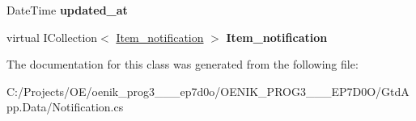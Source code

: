 \begin{DoxyCompactItemize}
\item 
\mbox{\label{class_gtd_app_1_1_data_1_1_notification_a1fbee509d8cb08e1e53fd6033822039a}} 
Date\+Time {\bfseries updated\+\_\+at}
\item 
\mbox{\label{class_gtd_app_1_1_data_1_1_notification_adc8c31ae4c7e325437be520f03ffbed3}} 
virtual I\+Collection$<$ \mbox{\hyperlink{class_gtd_app_1_1_data_1_1_item__notification}{Item\+\_\+notification}} $>$ {\bfseries Item\+\_\+notification}
\end{DoxyCompactItemize}


The documentation for this class was generated from the following file\+:\begin{DoxyCompactItemize}
\item 
C\+:/\+Projects/\+O\+E/oenik\+\_\+prog3\+\_\+\_\+\_\+ep7d0o/\+O\+E\+N\+I\+K\+\_\+\+P\+R\+O\+G3\+\_\+\_\+\_\+\+E\+P7\+D0\+O/\+Gtd\+App.\+Data/Notification.\+cs\end{DoxyCompactItemize}
